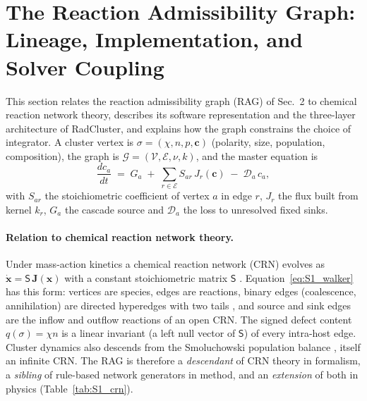 %

\section{The Reaction Admissibility Graph: Lineage, Implementation, and Solver Coupling}
\label{sup:S1}
\begingroup
\setlength{\emergencystretch}{3em}%

This section relates the reaction admissibility graph (RAG) of Sec.~2 to
chemical reaction network theory, describes its software representation
and the three-layer architecture of RadCluster, and explains how the graph
constrains the choice of integrator. A cluster vertex is
$\sigma=(\chi,n,p,\mathbf{c})$ (polarity, size, population, composition),
the graph is $\mathcal{G}=(\mathcal{V},\mathcal{E},\nu,k)$, and the master
equation is
\begin{equation}
  \frac{dc_a}{dt} \;=\; G_a \;+\; \sum_{r\in\mathcal{E}} S_{ar}\,J_r(\mathbf{c})
  \;-\; \mathcal{D}_a\,c_a ,
  \label{eq:S1_walker}
\end{equation}
with $S_{ar}$ the stoichiometric coefficient of vertex $a$ in edge $r$,
$J_r$ the flux built from kernel $k_r$, $G_a$ the cascade source and
$\mathcal{D}_a$ the loss to unresolved fixed sinks.

\paragraph{Relation to chemical reaction network theory.}
Under mass-action kinetics a chemical reaction network (CRN) evolves as
$\dot{\mathbf{x}}=\mathsf{S}\,\mathbf{J}(\mathbf{x})$ with a constant
stoichiometric matrix $\mathsf{S}$
\cite{HornJackson1972,Feinberg1987,Feinberg2019,ErdiToth1989}.
Equation~\eqref{eq:S1_walker} has this form: vertices are species, edges
are reactions, binary edges (coalescence, annihilation) are directed
hyperedges with two tails \cite{Klamt2009,Koch2010}, and source and sink
edges are the inflow and outflow reactions of an open CRN. The signed
defect content $q(\sigma)=\chi n$ is a linear invariant (a left null
vector of $\mathsf{S}$) of every intra-host edge. Cluster dynamics also
descends from the Smoluchowski population balance
\cite{Smoluchowski1917}, itself an infinite CRN. The RAG is therefore a
\emph{descendant} of CRN theory in formalism, a \emph{sibling} of
rule-based network generators in method, and an \emph{extension} of both
in physics (Table~\ref{tab:S1_crn}).


